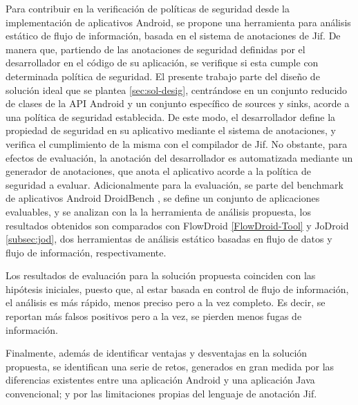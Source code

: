 Para contribuir en la verificación de políticas de seguridad desde la
implementación de aplicativos Android, se propone una herramienta para análisis
estático de flujo de información, basada en el sistema de anotaciones de Jif.
De manera que, partiendo de las anotaciones de seguridad definidas por el
desarrollador en el código de su aplicación, se verifique si esta cumple 
con determinada política de seguridad.\newline
El presente trabajo parte del diseño de solución ideal que se plantea
\ref{sec:sol-desig}, centrándose en un conjunto reducido de clases de la API
Android y un conjunto específico de sources y sinks, acorde a una política de
seguridad establecida.\newline 
De este modo, el desarrollador define la propiedad de seguridad en su
aplicativo mediante el sistema de anotaciones, y verifica el cumplimiento de la
misma con el compilador de Jif.\newline  
No obstante, para efectos de evaluación, la anotación del desarrollador es
automatizada mediante un generador de anotaciones, que anota el aplicativo
acorde a la política de seguridad a evaluar.\newline
Adicionalmente para la evaluación, se parte del benchmark de aplicativos Android
DroidBench \cite{DroidBenchBenchmarks}, se define un conjunto de aplicaciones
evaluables, y se analizan con la la herramienta de análisis propuesta, los
resultados obtenidos son comparados con FlowDroid \ref{FlowDroid-Tool} y
JoDroid \ref{subsec:jod}, dos herramientas de análisis estático basadas en
flujo de datos y flujo de información, respectivamente.

Los resultados de evaluación para la solución propuesta coinciden con las
hipótesis iniciales, puesto que, al estar basada en control de flujo de
información, el análisis es más rápido, menos preciso pero a la vez completo. Es
decir, se reportan más falsos positivos pero a la vez, se pierden menos fugas de
información.

Finalmente, además de identificar ventajas y desventajas en la solución
propuesta, se identifican una serie de retos, generados en gran medida por las
diferencias existentes entre una aplicación Android y una aplicación Java
convencional; y por las limitaciones propias del lenguaje de anotación Jif.
























